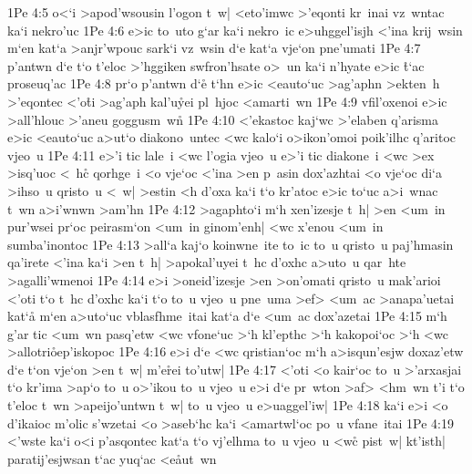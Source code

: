 \vs 1Pe 4:5
o<`i
>apod'wsousin
l'ogon
t~w|
<eto'imwc
>'eqonti
kr~inai
vz~wntac
ka`i
nekro'uc\bibvsend
\vs 1Pe 4:6
e>ic
to~uto
g`ar
ka`i
nekro~ic
e>uhggel'isjh
<'ina
krij~wsin
m`en
kat`a
>anjr'wpouc
sark`i
vz~wsin
d`e
kat`a
vje`on
pne'umati\bibvsend
\vs 1Pe 4:7
p'antwn
d`e
t`o
t'eloc
>'hggiken
swfron'hsate
o>~un
ka`i
n'hyate
e>ic
\r{t}`ac
proseuq'ac\bibvsend
\vs 1Pe 4:8
pr`o
p'antwn
d`e\r{}
t`hn
e>ic
<eauto`uc
>ag'aphn
>ekten~h
>'eqontec
<'o\r{t}i
>ag'aph
kal'u\r{y}ei
pl~hjoc
<amarti~wn\bibvsend
\vs 1Pe 4:9
vfil'oxenoi
e>ic
>all'hlouc
>'aneu
goggusm~w\r{n}\bibvsend
{}
\vs 1Pe 4:10
<'ekastoc
kaj`wc
>'elaben
q'arisma
e>ic
<eauto`uc
a>ut`o
diakono~untec
<wc
kalo`i
o>ikon'omoi
poik'ilhc
q'aritoc
vjeo~u\bibvsend
\vs 1Pe 4:11
e>'i
tic
lale~i
<wc
l'ogia
vjeo~u
e>'i
tic
diakone~i
<wc
>ex
>isq'uoc
<~h\r{c}
qorhge~i
<o
vje`oc
<'ina
>en
p~asin
dox'azhtai
<o
vje`oc
di`a
>ihso~u
qristo~u
<~w|
>estin
<h
d'oxa
ka`i
t`o
kr'atoc
e>ic
to`uc
a>i~wnac
t~wn
a>i'wnwn
>am'hn\bibvsend
\vs 1Pe 4:12
>agaphto`i
m`h
xen'izesje
t~h|
>en
<um~in
pur'wsei
pr`oc
peirasm`on
<um~in
ginom'enh|
<wc
x'enou
<um~in
sumba'inontoc\bibvsend
\vs 1Pe 4:13
>all`a
kaj`o
koinwne~ite
to~ic
to~u
qristo~u
paj'hmasin
qa'irete
<'ina
ka`i
>en
t~h|
>apokal'uyei
t~hc
d'oxhc
a>uto~u
qar~hte
>agalli'wmenoi\bibvsend
\vs 1Pe 4:14
e>i
>oneid'izesje
>en
>on'omati
qristo~u
mak'arioi
<'oti
t`o
t~hc
d'oxhc
ka`i
t`o
to~u
vjeo~u
pne~uma
>ef>
<um~ac
>anapa'uetai
kat`a\r{}
m`en
a>uto`uc
vblasfhme~itai
kat`a
d`e
<um~ac
dox'azetai\bibvsend
\vs 1Pe 4:15
m`h
g'ar
tic
<um~wn
pasq'etw
<wc
vfone`uc
>`h
kl'epthc
>`h
kakopoi`oc
>`h
<wc
>allotri\r{o}ep'iskopoc\bibvsend
{}
\vs 1Pe 4:16
e>i
d`e
<wc
qristian`oc
m`h
a>isqun'esjw
doxaz'etw
d`e
t`on
vje`on
>en
t~w|
m'e\r{r}ei
to'utw|\bibvsend
\vs 1Pe 4:17
<'oti
<o
kair`oc
to~u
>'arxasjai
t`o
kr'ima
>ap`o
to~u
o>'ikou
to~u
vjeo~u
e>i
d`e
pr~wton
>af>
<hm~wn
t'i
t`o
t'eloc
t~wn
>apeijo'untwn
t~w|
to~u
vjeo~u
e>uaggel'iw|\bibvsend
\vs 1Pe 4:18
ka`i
e>i
<o
d'ikaioc
m'olic
s'wzetai
<o
>aseb`hc
ka`i
<amartwl`oc
po~u
vfane~itai\bibvsend
\vs 1Pe 4:19
<'wste
ka`i
o<i
p'asqontec
kat`a
t`o
vj'elhma
to~u
vjeo~u
<w\r{c}
pist~w|
kt'isth|
paratij'esjwsan
t`ac
yuq`ac
<e\r{a}ut~wn
